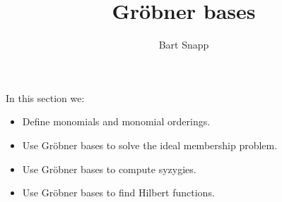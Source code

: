 \documentclass{ximera}
\author{Bart Snapp}
\title{Gr\"obner bases}
\begin{document}
\begin{abstract}
\end{abstract}
\maketitle
In this section we:

\begin{itemize}
\item Define monomials and monomial orderings.
\item Use Gr\"obner bases to solve the ideal membership problem.
\item Use Gr\"obner bases to compute syzygies.
\item Use Gr\"obner bases to find Hilbert functions.
\end{itemize}
\end{document}
